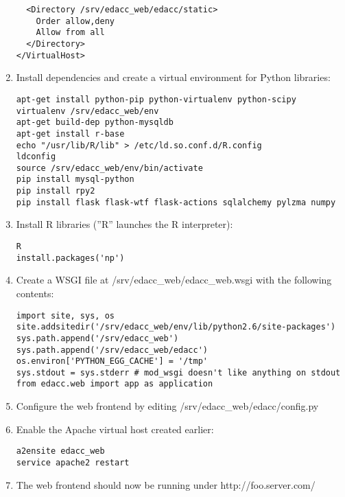 \begin{enumerate}
{\begin{verbatim}
  <Directory /srv/edacc_web/edacc/static>
    Order allow,deny
    Allow from all
  </Directory>
</VirtualHost>
\end{verbatim}
}
\item{Install dependencies and create a virtual environment for Python libraries:
\begin{verbatim}
apt-get install python-pip python-virtualenv python-scipy
virtualenv /srv/edacc_web/env
apt-get build-dep python-mysqldb
apt-get install r-base
echo "/usr/lib/R/lib" > /etc/ld.so.conf.d/R.config
ldconfig
source /srv/edacc_web/env/bin/activate
pip install mysql-python
pip install rpy2
pip install flask flask-wtf flask-actions sqlalchemy pylzma numpy
\end{verbatim}
}
\item{Install R libraries (''R'' launches the R interpreter):
\begin{verbatim}
R
install.packages('np')
\end{verbatim}
}
\item{Create a WSGI file at /srv/edacc\_web/edacc\_web.wsgi with the following contents:
\begin{verbatim}
import site, sys, os
site.addsitedir('/srv/edacc_web/env/lib/python2.6/site-packages')
sys.path.append('/srv/edacc_web')
sys.path.append('/srv/edacc_web/edacc')
os.environ['PYTHON_EGG_CACHE'] = '/tmp'
sys.stdout = sys.stderr # mod_wsgi doesn't like anything on stdout
from edacc.web import app as application
\end{verbatim}
}
\item Configure the web frontend by editing /srv/edacc\_web/edacc/config.py
\item{Enable the Apache virtual host created earlier:
\begin{verbatim}
a2ensite edacc_web
service apache2 restart
\end{verbatim}
}
\item The web frontend should now be running under http://foo.server.com/
\end{enumerate}